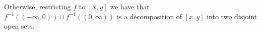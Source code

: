 Otherwise, restricting $f$ to $[x, y]$ we have that
$f^{-1}((-\infty, 0)) \cup f^{-1}((0, \infty))$ is a decomposition of $[x, y]$ into
two disjoint open sets.
